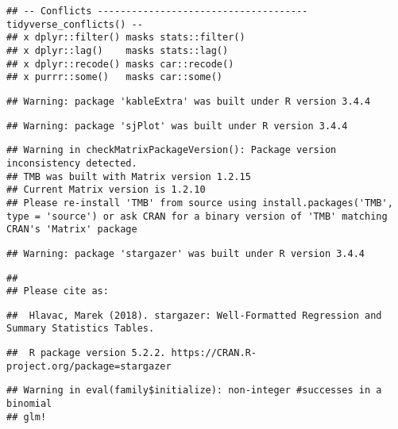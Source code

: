 \documentclass[]{article}
\begin{document}
\begin{verbatim}
## -- Conflicts ------------------------------------- tidyverse_conflicts() --
## x dplyr::filter() masks stats::filter()
## x dplyr::lag()    masks stats::lag()
## x dplyr::recode() masks car::recode()
## x purrr::some()   masks car::some()
\end{verbatim}

\begin{verbatim}
## Warning: package 'kableExtra' was built under R version 3.4.4
\end{verbatim}

\begin{verbatim}
## Warning: package 'sjPlot' was built under R version 3.4.4
\end{verbatim}

\begin{verbatim}
## Warning in checkMatrixPackageVersion(): Package version inconsistency detected.
## TMB was built with Matrix version 1.2.15
## Current Matrix version is 1.2.10
## Please re-install 'TMB' from source using install.packages('TMB', type = 'source') or ask CRAN for a binary version of 'TMB' matching CRAN's 'Matrix' package
\end{verbatim}

\begin{verbatim}
## Warning: package 'stargazer' was built under R version 3.4.4
\end{verbatim}

\begin{verbatim}
## 
## Please cite as:
\end{verbatim}

\begin{verbatim}
##  Hlavac, Marek (2018). stargazer: Well-Formatted Regression and Summary Statistics Tables.
\end{verbatim}

\begin{verbatim}
##  R package version 5.2.2. https://CRAN.R-project.org/package=stargazer
\end{verbatim}

\begin{verbatim}
## Warning in eval(family$initialize): non-integer #successes in a binomial
## glm!
\end{verbatim}
\end{document}

